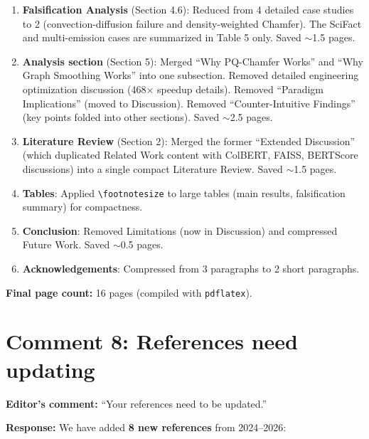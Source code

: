 \documentclass[11pt]{article}
\begin{document}
\begin{enumerate}[leftmargin=*]
\item \textbf{Falsification Analysis} (Section 4.6): Reduced from 4 detailed case studies to 2 (convection-diffusion failure and density-weighted Chamfer). The SciFact and multi-emission cases are summarized in Table 5 only. Saved ${\sim}$1.5 pages.

\item \textbf{Analysis section} (Section 5): Merged ``Why PQ-Chamfer Works'' and ``Why Graph Smoothing Works'' into one subsection. Removed detailed engineering optimization discussion (468$\times$ speedup details). Removed ``Paradigm Implications'' (moved to Discussion). Removed ``Counter-Intuitive Findings'' (key points folded into other sections). Saved ${\sim}$2.5 pages.

\item \textbf{Literature Review} (Section 2): Merged the former ``Extended Discussion'' (which duplicated Related Work content with ColBERT, FAISS, BERTScore discussions) into a single compact Literature Review. Saved ${\sim}$1.5 pages.

\item \textbf{Tables}: Applied \verb|\footnotesize| to large tables (main results, falsification summary) for compactness.

\item \textbf{Conclusion}: Removed Limitations (now in Discussion) and compressed Future Work. Saved ${\sim}$0.5 pages.

\item \textbf{Acknowledgements}: Compressed from 3 paragraphs to 2 short paragraphs.
\end{enumerate}

\textbf{Final page count:} 16 pages (compiled with \texttt{pdflatex}).

\section*{Comment 8: References need updating}

\textbf{Editor's comment:} ``Your references need to be updated.''

\textbf{Response:} We have added \textbf{8 new references} from 2024--2026:
\end{document}

